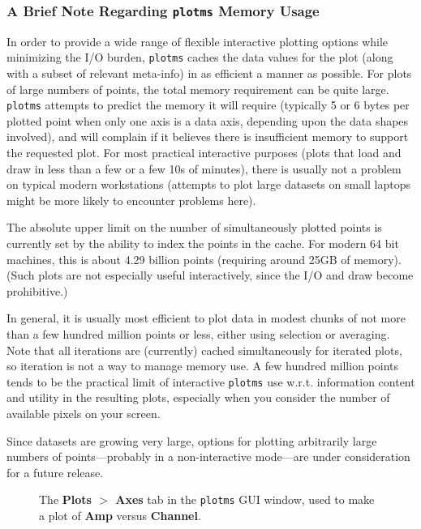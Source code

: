 \subsubsection{A Brief Note Regarding {\tt plotms} Memory Usage}

In order to provide a wide range of flexible interactive plotting
options while minimizing the I/O burden, {\tt plotms} caches the data
values for the plot (along with a subset of relevant meta-info) in as
efficient a manner as possible.  For plots of large numbers of points,
the total memory requirement can be quite large. {\tt plotms} attempts
to predict the memory it will require (typically 5 or 6 bytes per
plotted point when only one axis is a data axis, depending upon the
data shapes involved), and will complain if it believes there is
insufficient memory to support the requested plot.  For most practical
interactive purposes (plots that load and draw in less than a few or a
few 10s of minutes), there is usually not a problem on typical modern
workstations (attempts to plot large datasets on small laptops might
be more likely to encounter problems here).

The absolute upper limit on the number of simultaneously plotted points
is currently set by the ability to index the points in the
cache.  For modern 64 bit machines, this is about 4.29 billion
points (requiring around 25GB of memory).   (Such plots are
not especially useful interactively, since the I/O and draw
become prohibitive.)

In general, it is usually most efficient to plot data in modest
chunks of not more than a few hundred million points or less,
either using selection or averaging.  Note that all iterations
are (currently) cached simultaneously for iterated plots, so 
iteration is not a way to manage memory use.  A few hundred
million points tends to be the practical limit of interactive
{\tt plotms} use w.r.t. information content and utility in the 
resulting plots, especially when you consider the number of available
pixels on your screen.  

Since datasets are growing very large, options for plotting
arbitrarily large numbers of points---probably in a 
non-interactive mode---are under consideration for a future release.


\begin{figure}[h!]
\begin{center}
\caption{\label{fig:plotms_axes} The {\bf Plots $>$ Axes} tab in the {\tt plotms} GUI window, used to make a plot of {\bf Amp} versus {\bf Channel}.} 
\hrulefill
\end{center}
\end{figure}


